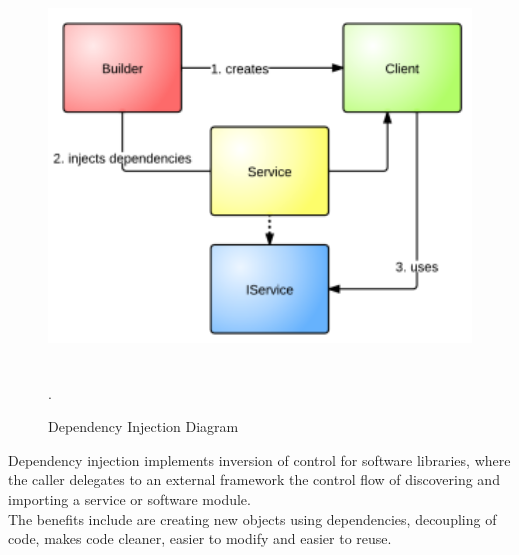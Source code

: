 \begin{flushleft}

	\begin{figure}[H]
		\graphicspath{ {images/} }
		\includegraphics[width=\textwidth, height=10cm]{SimpleDependencyInjection.png}
	   	\caption{Dependency Injection Diagram}.
	\end{figure}

Dependency injection implements inversion of control for software libraries, where the caller delegates to an external framework the control flow of discovering and importing a service or software module.\\
The benefits include are creating new objects using dependencies, decoupling of code, makes code cleaner, easier to modify and easier to reuse. 
\end{flushleft}


